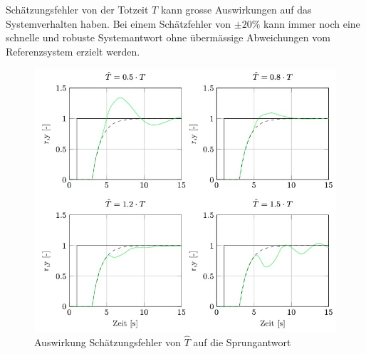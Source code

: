    Schätzungsfehler von der Totzeit $T$ kann grosse Auswirkungen auf das Systemverhalten haben. Bei einem Schätzfehler von $\pm 20\%$ kann immer noch eine schnelle und robuste Systemantwort ohne übermässige Abweichungen vom Referenzsystem erzielt werden.
    \begin{figure}[H]
        \centering
        \includegraphics[width = 0.55\linewidth]{images/02/est_error_hat_T.jpg}
        \caption{Auswirkung Schätzungsfehler von $\hat{T}$ auf die Sprungantwort}
    \end{figure}
    
